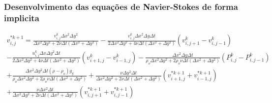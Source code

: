 \documentclass[xcolor=dvipsnames,10pt,aspectratio=169]{beamer}
\begin{document}
	\begin{frame}
		\frametitle{Desenvolvimento das equações de Navier-Stokes  de forma implicita}
	
		\begin{equation}
			\begin{split}
			v_{i , j}^{\ast k + 1} = \frac{v_{i , j}^{k} \Delta x ^2 \Delta y^2}{ \Delta x ^2 \Delta y^2 + 2 \nu \Delta t(\Delta x ^2 + \Delta y^2)} - \frac{ v_{i , j}^{k} \Delta x ^2 \Delta y \Delta t}{ 2 \Delta x ^2 \Delta y^2 + 4 \nu \Delta t(\Delta x ^2 + \Delta y^2)} \left( v_{i , j+ 1}^k - v_{i, j-1}^k   \right)  \\ - \frac{u_{i , j}^{k} \Delta x \Delta y^2 \Delta t}{ 2 \Delta x ^2 \Delta y^2 + 4 \nu \Delta t(\Delta x ^2 + \Delta y^2)} \left(v_{i + 1 , j}^k - v_{i - 1 , j}^k \right) - \frac{ \Delta x^2 \Delta y \Delta t}{ \rho_o \Delta x ^2 \Delta y^2 + 2 \rho_o \nu \Delta t(\Delta x ^2 + \Delta y^2)} (P_{i, j}^k - P_{i , j-1}^k ) \\ + \frac{ \Delta x ^2 \Delta y^2 \Delta t (\rho -\rho_o) g_y }{ \rho_o \Delta x ^2 \Delta y^2 + 2 \rho_o \nu \Delta t(\Delta x ^2 + \Delta y^2)} + \frac{ \nu \Delta y^2 {\Delta t}}{ \Delta x ^2 \Delta y^2 + 2 \nu \Delta t(\Delta x ^2 + \Delta y^2)} \left( v_{i+1 , j}^{\ast k + 1} + v_{i-1,j}^{\ast k + 1} \right) \\ + \frac{ \nu \Delta x^2 {\Delta t}}{ \Delta x ^2 \Delta y^2 + 2 \nu \Delta t(\Delta x ^2 + \Delta y^2)} \left( v_{i , j+1}^{\ast k + 1} + v_{i,j-1}^{\ast k + 1}\right)
			\end{split}
		\end{equation}
	
	\end{frame}
\end{document}

